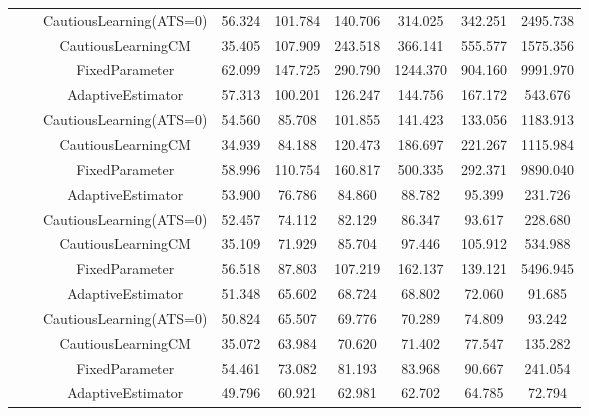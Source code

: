 \begin{table}[!h]
\begin{tabular}[t]{ccccccccc}
 &  & CautiousLearning(ATS=0) & 56.324 & 101.784 & 140.706 & 314.025 & 342.251 & 2495.738\\

 &  & CautiousLearningCM & 35.405 & 107.909 & 243.518 & 366.141 & 555.577 & 1575.356\\

 & \multirow[t]{-4}{*}{\centering\arraybackslash 0.25} & FixedParameter & 62.099 & 147.725 & 290.790 & 1244.370 & 904.160 & 9991.970\\
\cmidrule{2-9}
 &  & AdaptiveEstimator & 57.313 & 100.201 & 126.247 & 144.756 & 167.172 & 543.676\\

 &  & CautiousLearning(ATS=0) & 54.560 & 85.708 & 101.855 & 141.423 & 133.056 & 1183.913\\

 &  & CautiousLearningCM & 34.939 & 84.188 & 120.473 & 186.697 & 221.267 & 1115.984\\

 & \multirow[t]{-4}{*}{\centering\arraybackslash 0.35} & FixedParameter & 58.996 & 110.754 & 160.817 & 500.335 & 292.371 & 9890.040\\
\cmidrule{2-9}
 &  & AdaptiveEstimator & 53.900 & 76.786 & 84.860 & 88.782 & 95.399 & 231.726\\

 &  & CautiousLearning(ATS=0) & 52.457 & 74.112 & 82.129 & 86.347 & 93.617 & 228.680\\

 &  & CautiousLearningCM & 35.109 & 71.929 & 85.704 & 97.446 & 105.912 & 534.988\\

 & \multirow[t]{-4}{*}{\centering\arraybackslash 0.50} & FixedParameter & 56.518 & 87.803 & 107.219 & 162.137 & 139.121 & 5496.945\\
\cmidrule{2-9}
 &  & AdaptiveEstimator & 51.348 & 65.602 & 68.724 & 68.802 & 72.060 & 91.685\\

 &  & CautiousLearning(ATS=0) & 50.824 & 65.507 & 69.776 & 70.289 & 74.809 & 93.242\\

 &  & CautiousLearningCM & 35.072 & 63.984 & 70.620 & 71.402 & 77.547 & 135.282\\

 & \multirow[t]{-4}{*}{\centering\arraybackslash 0.75} & FixedParameter & 54.461 & 73.082 & 81.193 & 83.968 & 90.667 & 241.054\\
\cmidrule{2-9}
 &  & AdaptiveEstimator & 49.796 & 60.921 & 62.981 & 62.702 & 64.785 & 72.794\\


\end{tabular}
\end{table}
